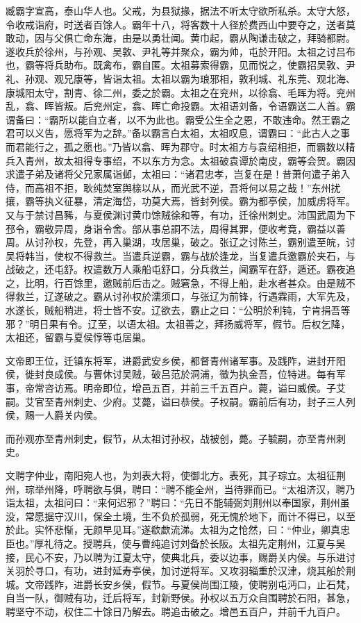 \documentclass[12pt,UTF8]{ctexbook}
\begin{document}
臧霸字宣高，泰山华人也。父戒，为县狱掾，据法不听太守欲所私杀。太守大怒，令收戒诣府，时送者百馀人。霸年十八，将客数十人径於费西山中要夺之，送者莫敢动，因与父俱亡命东海，由是以勇壮闻。黄巾起，霸从陶谦击破之，拜骑都尉。遂收兵於徐州，与孙观、吴敦、尹礼等并聚众，霸为帅，屯於开阳。太祖之讨吕布也，霸等将兵助布。既禽布，霸自匿。太祖募索得霸，见而悦之，使霸招吴敦、尹礼、孙观、观兄康等，皆诣太祖。太祖以霸为琅邪相，敦利城、礼东莞、观北海、康城阳太守，割青、徐二州，委之於霸。太祖之在兖州，以徐翕、毛晖为将。兖州乱，翕、晖皆叛。后兖州定，翕、晖亡命投霸。太祖语刘备，令语霸送二人首。霸谓备曰：“霸所以能自立者，以不为此也。霸受公生全之恩，不敢违命。然王霸之君可以义告，愿将军为之辞。”备以霸言白太祖，太祖叹息，谓霸曰：“此古人之事而君能行之，孤之愿也。”乃皆以翕、晖为郡守。时太祖方与袁绍相拒，而霸数以精兵入青州，故太祖得专事绍，不以东方为念。太祖破袁谭於南皮，霸等会贺。霸因求遣子弟及诸将父兄家属诣邺，太祖曰：“诸君忠孝，岂复在是！昔萧何遣子弟入侍，而高祖不拒，耿纯焚室舆榇以从，而光武不逆，吾将何以易之哉！”东州扰攘，霸等执义征暴，清定海岱，功莫大焉，皆封列侯。霸为都亭侯，加威虏将军。又与于禁讨昌豨，与夏侯渊讨黄巾馀贼徐和等，有功，迁徐州刺史。沛国武周为下邳令，霸敬异周，身诣令舍。部从事总詷不法，周得其罪，便收考竟，霸益以善周。从讨孙权，先登，再入巢湖，攻居巢，破之。张辽之讨陈兰，霸别遣至皖，讨吴将韩当，使权不得救兰。当遣兵逆霸，霸与战於逢龙，当复遣兵邀霸於夹石，与战破之，还屯舒。权遣数万人乘船屯舒口，分兵救兰，闻霸军在舒，遁还。霸夜追之，比明，行百馀里，邀贼前后击之。贼窘急，不得上船，赴水者甚众。由是贼不得救兰，辽遂破之。霸从讨孙权於濡须口，与张辽为前锋，行遇霖雨，大军先及，水遂长，贼船稍进，将士皆不安。辽欲去，霸止之曰：“公明於利钝，宁肯捐吾等邪？”明日果有令。辽至，以语太祖。太祖善之，拜扬威将军，假节。后权乞降，太祖还，留霸与夏侯惇等屯居巢。

文帝即王位，迁镇东将军，进爵武安乡侯，都督青州诸军事。及践阼，进封开阳侯，徙封良成侯。与曹休讨吴贼，破吕范於洞浦，徵为执金吾，位特进。每有军事，帝常咨访焉。明帝即位，增邑五百，并前三千五百户。薨，谥曰威侯。子艾嗣。艾官至青州刺史、少府。艾薨，谥曰恭侯。子权嗣。霸前后有功，封子三人列侯，赐一人爵关内侯。

而孙观亦至青州刺史，假节，从太祖讨孙权，战被创，薨。子毓嗣，亦至青州刺史。

文聘字仲业，南阳宛人也，为刘表大将，使御北方。表死，其子琮立。太祖征荆州，琮举州降，呼聘欲与俱，聘曰：“聘不能全州，当待罪而已。“太祖济汉，聘乃诣太祖，太祖问曰：“来何迟邪？”聘曰：“先日不能辅弼刘荆州以奉国家，荆州虽没，常愿据守汉川，保全土境，生不负於孤弱，死无愧於地下，而计不得已，以至於此。实怀悲惭，无颜早见耳。”遂欷歔流涕。太祖为之怆然，曰：“仲业，卿真忠臣也。”厚礼待之。授聘兵，使与曹纯追讨刘备於长阪。太祖先定荆州，江夏与吴接，民心不安，乃以聘为江夏太守，使典北兵，委以边事，赐爵关内侯。与乐进讨关羽於寻口，有功，进封延寿亭侯，加讨逆将军。又攻羽辎重於汉津，烧其船於荆城。文帝践阼，进爵长安乡侯，假节。与夏侯尚围江陵，使聘别屯沔口，止石梵，自当一队，御贼有功，迁后将军，封新野侯。孙权以五万众自围聘於石阳，甚急，聘坚守不动，权住二十馀日乃解去。聘追击破之。增邑五百户，并前千九百户。
\end{document}
